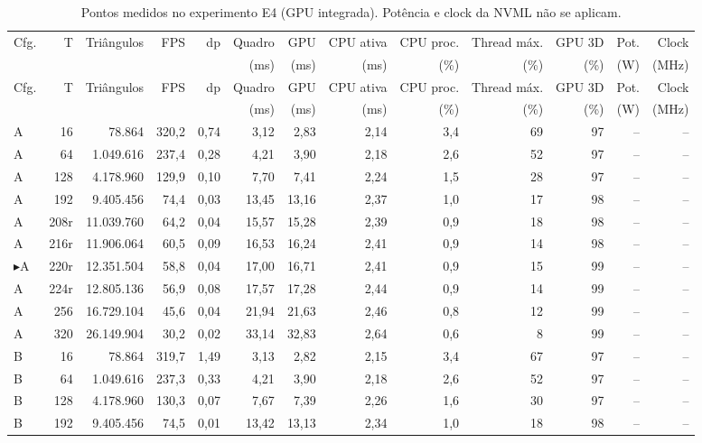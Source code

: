 {\scriptsize
\setlength{\tabcolsep}{2.6pt}
\begin{longtable}{l r r r r r r r r r r r r}
\caption{Pontos medidos no experimento E4 (GPU integrada). Potência e clock da NVML não se aplicam.}\label{tab:pontos_e4}\\
\toprule
Cfg. & T & Triângulos & FPS & dp & Quadro & GPU & CPU ativa & CPU proc. & Thread máx. & GPU 3D & Pot. & Clock \\
 & & & & & (ms) & (ms) & (ms) & (\%) & (\%) & (\%) & (W) & (MHz) \\
\midrule
\endfirsthead
\toprule
Cfg. & T & Triângulos & FPS & dp & Quadro & GPU & CPU ativa & CPU proc. & Thread máx. & GPU 3D & Pot. & Clock \\
 & & & & & (ms) & (ms) & (ms) & (\%) & (\%) & (\%) & (W) & (MHz) \\
\midrule
\endhead
A & 16 & 78.864 & 320,2 & 0,74 & 3,12 & 2,83 & 2,14 & 3,4 & 69 & 97 & -- & -- \\
A & 64 & 1.049.616 & 237,4 & 0,28 & 4,21 & 3,90 & 2,18 & 2,6 & 52 & 97 & -- & -- \\
A & 128 & 4.178.960 & 129,9 & 0,10 & 7,70 & 7,41 & 2,24 & 1,5 & 28 & 97 & -- & -- \\
A & 192 & 9.405.456 & 74,4 & 0,03 & 13,45 & 13,16 & 2,37 & 1,0 & 17 & 98 & -- & -- \\
A & 208r & 11.039.760 & 64,2 & 0,04 & 15,57 & 15,28 & 2,39 & 0,9 & 18 & 98 & -- & -- \\
A & 216r & 11.906.064 & 60,5 & 0,09 & 16,53 & 16,24 & 2,41 & 0,9 & 14 & 98 & -- & -- \\
$\blacktriangleright$A & 220r & 12.351.504 & 58,8 & 0,04 & 17,00 & 16,71 & 2,41 & 0,9 & 15 & 99 & -- & -- \\
A & 224r & 12.805.136 & 56,9 & 0,08 & 17,57 & 17,28 & 2,44 & 0,9 & 14 & 99 & -- & -- \\
A & 256 & 16.729.104 & 45,6 & 0,04 & 21,94 & 21,63 & 2,46 & 0,8 & 12 & 99 & -- & -- \\
A & 320 & 26.149.904 & 30,2 & 0,02 & 33,14 & 32,83 & 2,64 & 0,6 & 8 & 99 & -- & -- \\
\midrule
B & 16 & 78.864 & 319,7 & 1,49 & 3,13 & 2,82 & 2,15 & 3,4 & 67 & 97 & -- & -- \\
B & 64 & 1.049.616 & 237,3 & 0,33 & 4,21 & 3,90 & 2,18 & 2,6 & 52 & 97 & -- & -- \\
B & 128 & 4.178.960 & 130,3 & 0,07 & 7,67 & 7,39 & 2,26 & 1,6 & 30 & 97 & -- & -- \\
B & 192 & 9.405.456 & 74,5 & 0,01 & 13,42 & 13,13 & 2,34 & 1,0 & 18 & 98 & -- & -- \\

\end{longtable}}
